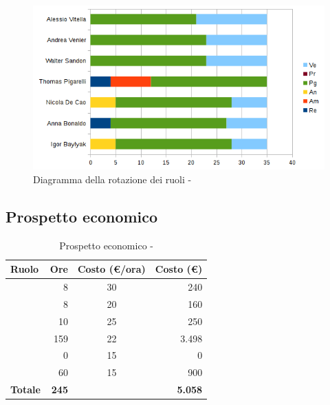 \documentclass[12pt,a4paper]{article}
\begin{document}
\begin{center}
	\begin{figure}[H]
		\centering		\includegraphics[width=\textwidth]{diagrammaBarreProgettazioneArchitetturaleRotazioneRuoli.png}
		\caption{Diagramma della rotazione dei ruoli - \FPA}
	\end{figure}
\end{center}

\subsection{Prospetto economico}

\begin{table}[H]
	\begin{center}
		\begin{tabular}{l r c r}
			\toprule
			\textbf{Ruolo}	& \textbf{Ore} & \textbf{Costo (\euro/ora)}	& \textbf{Costo (\euro)} \\ \midrule
			\midrule
			\RE & 8 & 30 & 240 \\ \midrule
			\AM & 8 & 20 & 160 \\ \midrule
			\AN & 10 & 25 & 250 \\ \midrule
			\PG & 159 & 22 & 3.498 \\ \midrule
			\PR & 0 & 15 & 0 \\ \midrule
			\VR & 60 & 15 & 900 \\ \midrule
			\textbf{Totale} & \textbf{245} &  & \textbf{5.058} \\
			\bottomrule
		\end{tabular}
		\caption{Prospetto economico - \FPA}
	\end{center}
\end{table}
\end{document}
